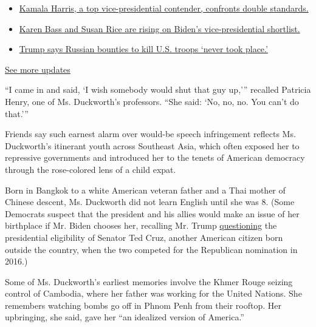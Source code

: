 \begin{itemize}
\tightlist
\item
  \href{https://www.nytimes3xbfgragh.onion/2020/07/31/us/elections/biden-vs-trump.html?action=click\&pgtype=Article\&state=default\&region=MAIN_CONTENT_1\&context=storylines_live_updates\#link-29fdff45}{Kamala
  Harris, a top vice-presidential contender, confronts double
  standards.}
\item
  \href{https://www.nytimes3xbfgragh.onion/2020/07/31/us/elections/biden-vs-trump.html?action=click\&pgtype=Article\&state=default\&region=MAIN_CONTENT_1\&context=storylines_live_updates\#link-13ec3d9c}{Karen
  Bass and Susan Rice are rising on Biden's vice-presidential
  shortlist.}
\item
  \href{https://www.nytimes3xbfgragh.onion/2020/07/31/us/elections/biden-vs-trump.html?action=click\&pgtype=Article\&state=default\&region=MAIN_CONTENT_1\&context=storylines_live_updates\#link-49e9a016}{Trump
  says Russian bounties to kill U.S. troops `never took place.'}
\end{itemize}

\href{https://www.nytimes3xbfgragh.onion/2020/07/31/us/elections/biden-vs-trump.html?action=click\&pgtype=Article\&state=default\&region=MAIN_CONTENT_1\&context=storylines_live_updates}{See
more updates}

``I came in and said, `I wish somebody would shut that guy up,'''
recalled Patricia Henry, one of Ms. Duckworth's professors. ``She said:
`No, no, no. You can't do that.'''

Friends say such earnest alarm over would-be speech infringement
reflects Ms. Duckworth's itinerant youth across Southeast Asia, which
often exposed her to repressive governments and introduced her to the
tenets of American democracy through the rose-colored lens of a child
expat.

Born in Bangkok to a white American veteran father and a Thai mother of
Chinese descent, Ms. Duckworth did not learn English until she was 8.
(Some Democrats suspect that the president and his allies would make an
issue of her birthplace if Mr. Biden chooses her, recalling Mr. Trump
\href{https://www.politico.com/story/2016/04/donald-trump-ted-cruz-canada-222347}{questioning}
the presidential eligibility of Senator Ted Cruz, another American
citizen born outside the country, when the two competed for the
Republican nomination in 2016.)

Some of Ms. Duckworth's earliest memories involve the Khmer Rouge
seizing control of Cambodia, where her father was working for the United
Nations. She remembers watching bombs go off in Phnom Penh from their
rooftop. Her upbringing, she said, gave her ``an idealized version of
America.''


